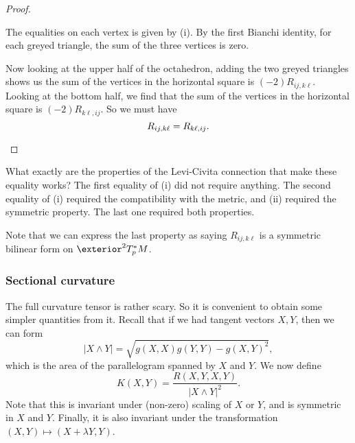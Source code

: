 \documentclass[a4paper]{article}
\begin{document}
\begin{proof}
\begin{enumerate}
\begin{center}
      \end{center}
      The equalities on each vertex is given by (i). By the first Bianchi identity, for each greyed triangle, the sum of the three vertices is zero.

      Now looking at the upper half of the octahedron, adding the two greyed triangles shows us the sum of the vertices in the horizontal square is $(-2) R_{ij, k\ell}$. Looking at the bottom half, we find that the sum of the vertices in the horizontal square is $(-2)R_{k\ell, ij}$. So we must have
      \[
        R_{ij, k\ell} = R_{k\ell, ij}.\qedhere
      \]%
  \end{enumerate}
\end{proof}
What exactly are the properties of the Levi-Civita connection that make these equality works? The first equality of (i) did not require anything. The second equality of (i) required the compatibility with the metric, and (ii) required the symmetric property. The last one required both properties.

Note that we can express the last property as saying $R_{ij, k\ell}$ is a symmetric bilinear form on $\exterior^2 T_p^*M$.

\subsubsection*{Sectional curvature}
The full curvature tensor is rather scary. So it is convenient to obtain some simpler quantities from it. Recall that if we had tangent vectors $X, Y$, then we can form
\[
  |X \wedge Y| = \sqrt{g(X, X)g(Y, Y) - g(X, Y)^2},
\]
which is the area of the parallelogram spanned by $X$ and $Y$. We now define
\[
  K(X, Y) = \frac{R(X, Y, X, Y)}{|X \wedge Y|^2}.
\]
Note that this is invariant under (non-zero) scaling of $X$ or $Y$, and is symmetric in $X$ and $Y$. Finally, it is also invariant under the transformation $(X, Y) \mapsto (X + \lambda Y, Y)$.
\end{document}
